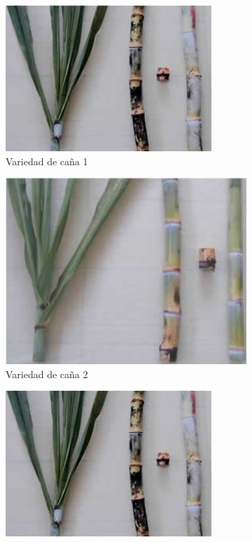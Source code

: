\documentclass{article}%
\begin{document}
\begin{figure}[h!]%
\begin{subfigure}{0.33\linewidth}%
\includegraphics[width=0.95\linewidth]{Cana/RD75-11.png}%
\caption{Variedad de caña 1}%
\end{subfigure}%
\begin{subfigure}{0.33\linewidth}%
\includegraphics[width=0.95\linewidth]{Cana/POJ2878.png}%
\caption{Variedad de caña 2}%
\end{subfigure}%
\begin{subfigure}{0.33\linewidth}%
\includegraphics[width=0.95\linewidth]{Cana/RD75-11.png}%

\end{subfigure}
\end{figure}
\end{document}
